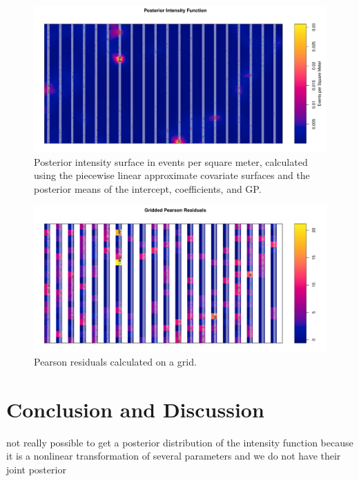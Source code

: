 \documentclass[]{interact}
\begin{document}
\begin{figure}[h]
\includegraphics[width=\textwidth]{figures/bei-effort_intensity.pdf}
\caption{Posterior intensity surface in events per square meter, calculated
using the piecewise linear approximate covariate surfaces and the posterior
means of the intercept, coefficients, and GP.}
\label{effortintensity}
\end{figure}

\begin{figure}[h]
\includegraphics[width=\textwidth]{figures/bei-effort_residuals.pdf}
\caption{Pearson residuals calculated on a grid.}
\label{effortresiduals}
\end{figure}


\section{Conclusion and Discussion}
\label{conclusion}

not really possible to get a posterior distribution of the intensity function
because it is a nonlinear transformation of several parameters and we do not
have their joint posterior
\end{document}
